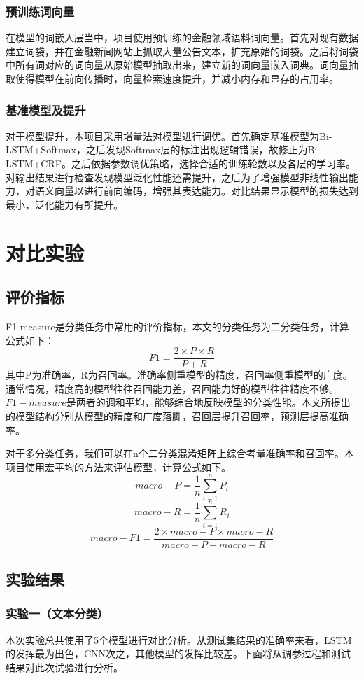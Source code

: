 \documentclass[letterpaper]{article}
\begin{document}
    \subsubsection{预训练词向量}
    在模型的词嵌入层当中，项目使用预训练的金融领域语料词向量。首先对现有数据建立词袋，并在金融新闻网站上抓取大量公告文本，扩充原始的词袋。之后将词袋中所有词对应的词向量从原始模型抽取出来，建立新的词向量嵌入词典。词向量抽取使得模型在前向传播时，向量检索速度提升，并减小内存和显存的占用率。

    \subsubsection{基准模型及提升} 
    对于模型提升，本项目采用增量法对模型进行调优。首先确定基准模型为Bi-LSTM+Softmax，之后发现Softmax层的标注出现逻辑错误，故修正为Bi-LSTM+CRF。之后依据参数调优策略，选择合适的训练轮数以及各层的学习率。对输出结果进行检查发现模型泛化性能还需提升，之后为了增强模型非线性输出能力，对语义向量以进行前向编码，增强其表达能力。对比结果显示模型的损失达到最小，泛化能力有所提升。

\section{对比实验}
  \subsection{评价指标}
  F1-measure是分类任务中常用的评价指标，本文的分类任务为二分类任务，计算公式如下：
  $$
  F1=\frac{2\times P\times R}{P+R}
  $$
  其中P为准确率，R为召回率。准确率侧重模型的精度，召回率侧重模型的广度。通常情况，精度高的模型往往召回能力差，召回能力好的模型往往精度不够。$F1-measure$是两者的调和平均，能够综合地反映模型的分类性能。本文所提出的模型结构分别从模型的精度和广度落脚，召回层提升召回率，预测层提高准确率。
  
  对于多分类任务，我们可以在n个二分类混淆矩阵上综合考量准确率和召回率。本项目使用宏平均的方法来评估模型，计算公式如下。
  $$
  macro-P=\frac{1}{n}\sum_{i=1}^n{P_i}
  $$
  $$
  macro-R=\frac{1}{n}\sum_{i=1}^n{R_i}
  $$
  $$
  macro-F1=\frac{2\times macro-P\times macro-R}{macro-P+macro-R}
  $$

  \newpage
  \subsection{实验结果}
    \subsubsection{实验一（文本分类）}
    本次实验总共使用了5个模型进行对比分析。从测试集结果的准确率来看，LSTM的发挥最为出色，CNN次之，其他模型的发挥比较差。下面将从调参过程和测试结果对此次试验进行分析。
    
\end{document}
